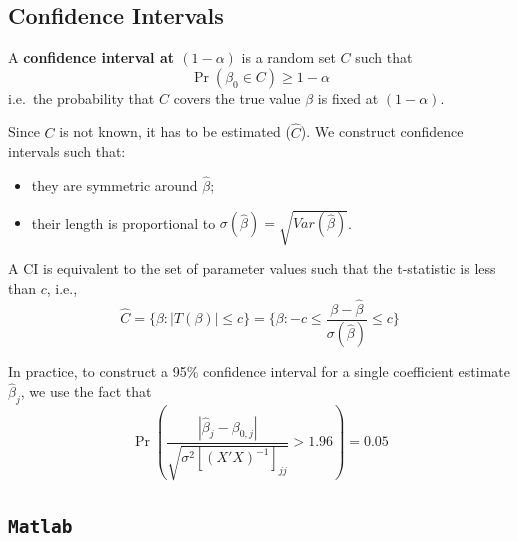 \documentclass[12pt,]{book}
\newenvironment{Shaded}{\begin{snugshade}}{\end{snugshade}}
\newcommand{\CommentTok}[1]{\textcolor[rgb]{0.56,0.35,0.01}{\textit{#1}}}
\newcommand{\FloatTok}[1]{\textcolor[rgb]{0.00,0.00,0.81}{#1}}
\newcommand{\NormalTok}[1]{#1}
\providecommand{\tightlist}{%
  \setlength{\itemsep}{0pt}\setlength{\parskip}{0pt}}
\begin{document}
\hypertarget{confidence-intervals}{%
\subsection{Confidence Intervals}\label{confidence-intervals}}

A \textbf{confidence interval at \((1-\alpha)\)} is a random set \(C\) such that
\[
     \Pr(\beta_0 \in C) \geq 1- \alpha
\]
i.e.~the probability that \(C\) covers the true value \(\beta\) is fixed at \((1-\alpha)\).

Since \(C\) is not known, it has to be estimated (\(\hat{C}\)). We construct confidence intervals such that:

\begin{itemize}
\tightlist
\item
  they are symmetric around \(\hat \beta\);
\item
  their length is proportional to \(\sigma(\hat \beta) = \sqrt{Var(\hat \beta)}\).
\end{itemize}

A CI is equivalent to the set of parameter values such that the t-statistic is less than \(c\), i.e.,
\[
\hat{C} = \bigg\{ \beta: |T(\beta) | \leq c \bigg\} = \bigg\{ \beta: - c\leq \frac{\beta - \hat \beta}{\sigma(\hat \beta)} \leq c \bigg\}
\]

In practice, to construct a 95\% confidence interval for a single coefficient estimate \(\hat \beta_j\), we use the fact that
\[
    \Pr \left( \frac{| \hat \beta_j - \beta _ {0,j} |}{ \sqrt{\sigma^2 [(X'X)^{-1}] _ {jj} }} > 1.96 \right) = 0.05
\]

\hypertarget{matlab-5}{%
\subsection{\texorpdfstring{\texttt{Matlab}}{Matlab}}\label{matlab-5}}

\begin{Shaded}
\end{Shaded}
\end{document}
